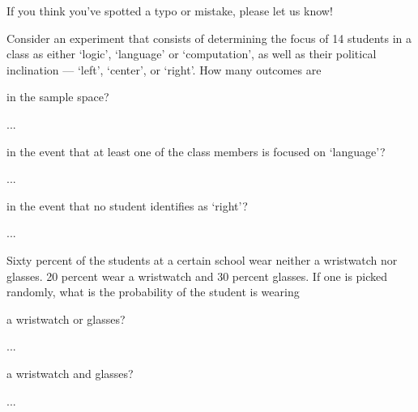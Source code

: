 \documentclass[a4paper,10pt,landscape,twocolumn]{scrartcl}
\begin{document}
\solutions

{\sffamily\noindent
  If you think you've spotted a typo or mistake, please let us know!
}


\begin{exercise}[]
  Consider an experiment that consists of determining the focus of 14 students
  in a class as either `logic', `language' or `computation', as well as their
  political inclination --- `left', `center', or `right'. How many outcomes are
  
  \begin{subex}
    in the sample space?
  \end{subex}
  
  \begin{solution}
    ...  
  \end{solution}
  
  \begin{subex}
    in the event that at least one of the class members is focused on
    `language'?
  \end{subex}
  
  \begin{solution}
    ...  
  \end{solution}
  
  
  \begin{subex}
    in the event that no student identifies as `right'?
  \end{subex}
  
  \begin{solution}
    ...  
  \end{solution}
\end{exercise}


\begin{exercise}[]
  Sixty percent of the students at a certain school wear neither a wristwatch
  nor glasses. 20 percent wear a wristwatch and 30 percent glasses. If one is
  picked randomly, what is the probability of the student is wearing

  \begin{subex}
    a wristwatch or glasses?
  \end{subex}
  
  \begin{solution}
    ...  
  \end{solution}
    
  \begin{subex}
    a wristwatch and glasses?
  \end{subex}		
  
  \begin{solution}
    ...  
  \end{solution}
  
\end{exercise}
\end{document}
